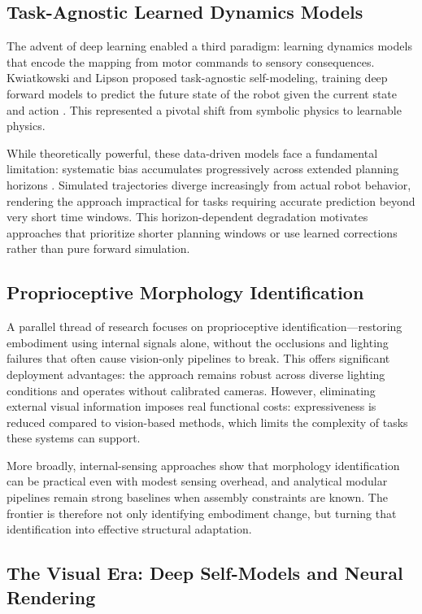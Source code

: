 ﻿\documentclass[12pt,a4paper,oneside]{report}
\begin{document}
\subsection{Task-Agnostic Learned Dynamics Models}

The advent of deep learning enabled a third paradigm: learning dynamics models that encode the mapping from motor commands to sensory consequences. Kwiatkowski and Lipson proposed task-agnostic self-modeling, training deep forward models to predict the future state of the robot given the current state and action \cite{kwiatkowski2019task}. This represented a pivotal shift from symbolic physics to learnable physics.

While theoretically powerful, these data-driven models face a fundamental limitation: systematic bias accumulates progressively across extended planning horizons \cite{kwiatkowski2019task}. Simulated trajectories diverge increasingly from actual robot behavior, rendering the approach impractical for tasks requiring accurate prediction beyond very short time windows. This horizon-dependent degradation motivates approaches that prioritize shorter planning windows or use learned corrections rather than pure forward simulation.

\subsection{Proprioceptive Morphology Identification}

A parallel thread of research focuses on proprioceptive identification---restoring embodiment using internal signals alone, without the occlusions and lighting failures that often cause vision-only pipelines to break. This offers significant deployment advantages: the approach remains robust across diverse lighting conditions and operates without calibrated cameras. However, eliminating external visual information imposes real functional costs: expressiveness is reduced compared to vision-based methods, which limits the complexity of tasks these systems can support.

More broadly, internal-sensing approaches show that morphology identification can be practical even with modest sensing overhead, and analytical modular pipelines remain strong baselines when assembly constraints are known. The frontier is therefore not only identifying embodiment change, but turning that identification into effective structural adaptation.

\subsection{The Visual Era: Deep Self-Models and Neural Rendering}
\end{document}
